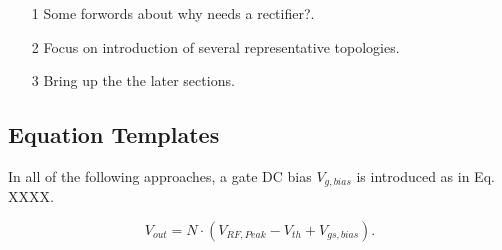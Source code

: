 \documentclass[rfvlsi_template_jrnl.tex]{subfiles}
\begin{document}
\begin{itemize}
\item[1] Some forwords about why needs a rectifier?.
\item[2] Focus on introduction of several representative topologies.
\item[3] Bring up the the later sections.
\end{itemize}

\subsection{Equation Templates }

In all of the following approaches, a gate DC bias $V_{g,bias}$ is introduced as in Eq. XXXX.

\begin{equation}
\label{NStageRectVout}
V_{out}=N⋅(V_{RF,Peak}-V_{th}+V_{gs,bias}).
\end{equation}
\end{document}

